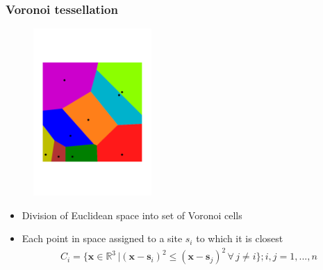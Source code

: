 \documentclass[t]{beamer}
\begin{document}
	\begin{frame}
	    \frametitle{Voronoi tessellation}
	    \begin{figure}
            \includegraphics[width=0.4\textwidth]{figures/Voronoi.pdf}
        \end{figure}
        \begin{itemize}
            \item Division of Euclidean space into set of Voronoi cells
            \item Each point in space assigned to a site $s_i$ to which it is closest
            \begin{align*}
                C_i = \{ \mathbf{x} \in \mathbb{R}^3 \, | ( \mathbf{x} - \mathbf{s}_i )^2 \leq ( \mathbf{x} - \mathbf{s}_j )^2 \, \forall \, j \neq i \}; i,j=1,...,n
			\end{align*}
        \end{itemize}
	\end{frame}
\end{document}

